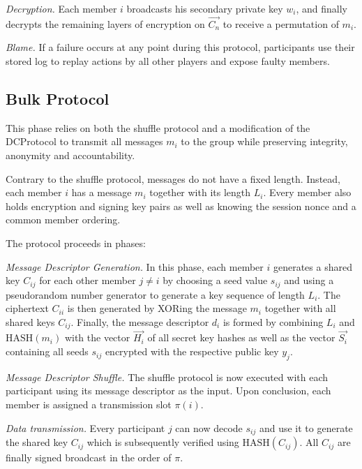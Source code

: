 \emph{Decryption.}
      Each member $i$ broadcasts his secondary private key $w_i$, and finally decrypts the remaining
      layers of encryption on $\vec{C_n}$ to receive a permutation of $m_i$.
      
\emph{Blame.}
      If a failure occurs at any point during this protocol, participants use their stored
      log to replay actions by all other players and expose faulty members.

\subsection{Bulk Protocol}

This phase relies on both the shuffle protocol and a modification of the \ac{DCProtocol}
to transmit all messages $m_i$ to the group while preserving integrity, anonymity and accountability.

Contrary to the shuffle protocol, messages do not have a fixed length. Instead, each member
$i$ has a message $m_i$ together with its length $L_i$. Every member also holds encryption and
signing key pairs as well as knowing the session nonce and a common member ordering.

The protocol proceeds in phases:

\emph{Message Descriptor Generation.}
      In this phase, each member $i$ generates a shared key $C_{ij}$ for each other member $j \neq i$
      by choosing a seed value $s_{ij}$ and using a pseudorandom number generator \cite{stinson2006cryptography} to generate a
      key sequence of length $L_i$. The ciphertext $C_{ii}$ is then generated by
      XORing the message $m_i$ together with all shared keys $C_{ij}$. Finally, the message descriptor
      $d_i$ is formed by combining $L_i$ and $\text{HASH}(m_i)$ with the vector $\vec{H_i}$ of all secret key
      hashes as well as the vector $\vec{S_i}$ containing all seeds $s_{ij}$ encrypted with the respective
      public key $y_j$.

\emph{Message Descriptor Shuffle.}
      The shuffle protocol is now executed with each participant using its message descriptor
      as the input. Upon conclusion, each member is assigned a transmission slot $\pi(i)$.

\emph{Data transmission.}
      Every participant $j$ can now decode $s_{ij}$ and use it to generate the shared key $C_{ij}$ which
      is subsequently verified using $\text{HASH}(C_{ij})$. All $C_{ij}$ are finally signed broadcast in the order of $\pi$.
      
